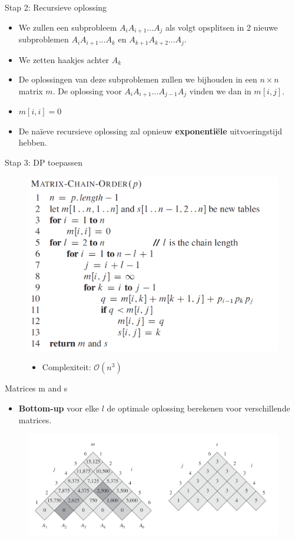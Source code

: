 \documentclass
   [kulak] %
   {kulakbeamer}
\begin{document}
\begin{frame}{Stap 2: Recursieve oplossing}
\begin{itemize}
    \item<1-> We zullen een subprobleem $A_iA_{i+1}...A_j$ als volgt opsplitsen in 2 nieuwe subproblemen $A_iA_{i+1}...A_k$ en $A_{k+1}A_{k+2}...A_j$.
    \item<2-> We zetten haakjes achter $A_k$
    \item<3-> De oplossingen van deze subproblemen zullen we bijhouden in een $n \times n$ matrix $m$. De oplossing voor $A_iA_{i+1}...A_{j-1}A_j$ vinden we dan in $m[i,j]$.
    \item<4-> $m[i,i] = 0$
    \item<5-> De naïeve recursieve oplossing zal opnieuw \textbf{exponentiële} uitvoeringstijd hebben.
\end{itemize}
\end{frame}

\begin{frame}{Stap 3: DP toepassen}
\begin{figure}
    \centering
    \includegraphics[width=0.55\linewidth]{matrixchain.png}
    \begin{itemize}
        \item<1-> Complexiteit: $\mathcal{O}(n^3)$
    \end{itemize}
\end{figure}
\end{frame}

\begin{frame}{Matrices m and s}
\begin{itemize}
    \item \textbf{Bottom-up} voor elke $l$ de optimale oplossing berekenen voor verschillende matrices.
\end{itemize}
\begin{figure}
    \centering
    \includegraphics[width=0.8\linewidth]{mands.png}
\end{figure}
\end{frame}
\end{document}
